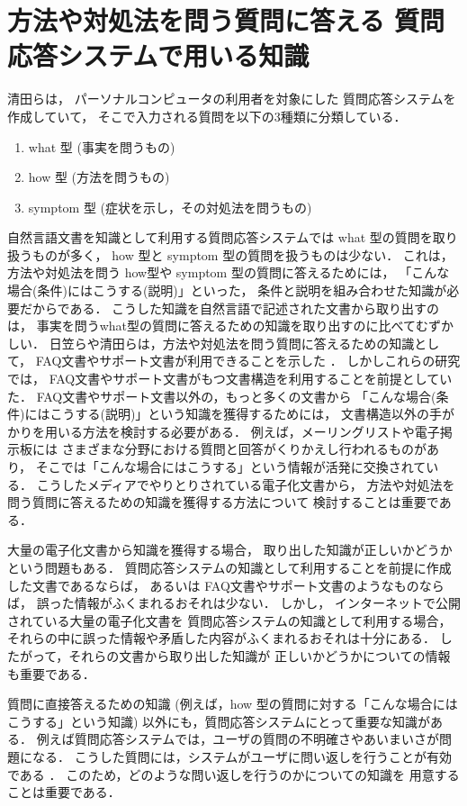  \section{方法や対処法を問う質問に答える
 質問応答システムで用いる知識}

 清田らは，
 パーソナルコンピュータの利用者を対象にした
 質問応答システムを作成していて，
 そこで入力される質問を以下の3種類に分類している\cite{proc:kiyota02}．
 \begin{enumerate}
  \item what 型 (事実を問うもの)
  \item how 型 (方法を問うもの)
  \item symptom 型 (症状を示し，その対処法を問うもの)
 \end{enumerate}
 自然言語文書を知識として利用する質問応答システムでは
 what 型の質問を取り扱うものが多く，
 how 型と symptom 型の質問を扱うものは少ない．
 これは，方法や対処法を問う how型や symptom 型の質問に答えるためには，
 「こんな場合(条件)にはこうする(説明)」といった，
 条件と説明を組み合わせた知識が必要だからである．
 こうした知識を自然言語で記述された文書から取り出すのは，
 事実を問うwhat型の質問に答えるための知識を取り出すのに比べてむずかしい．
 日笠らや清田らは，方法や対処法を問う質問に答えるための知識として，
 FAQ文書やサポート文書が利用できることを示した
 \cite{proc:higasa99}\cite{proc:kiyota02}．
 しかしこれらの研究では， 
 FAQ文書やサポート文書がもつ文書構造を利用することを前提としていた．
 FAQ文書やサポート文書以外の，もっと多くの文書から
 「こんな場合(条件)にはこうする(説明)」という知識を獲得するためには，
 文書構造以外の手がかりを用いる方法を検討する必要がある．
 例えば，メーリングリストや電子掲示板には
 さまざまな分野における質問と回答がくりかえし行われるものがあり，
 そこでは「こんな場合にはこうする」という情報が活発に交換されている．
 こうしたメディアでやりとりされている電子化文書から，
 方法や対処法を問う質問に答えるための知識を獲得する方法について
 検討することは重要である．
 

 大量の電子化文書から知識を獲得する場合，
 取り出した知識が正しいかどうかという問題もある．
 質問応答システムの知識として利用することを前提に作成した文書であるならば，
 あるいは FAQ文書やサポート文書のようなものならば，
 誤った情報がふくまれるおそれは少ない．
 しかし， 
 インターネットで公開されている大量の電子化文書を
 質問応答システムの知識として利用する場合，
 それらの中に誤った情報や矛盾した内容がふくまれるおそれは十分にある．
 したがって，それらの文書から取り出した知識が
 正しいかどうかについての情報も重要である．

 質問に直接答えるための知識
 (例えば，how 型の質問に対する「こんな場合にはこうする」という知識)
 以外にも，質問応答システムにとって重要な知識がある．
 例えば質問応答システムでは，ユーザの質問の不明確さやあいまいさが問題になる．
 こうした質問には，システムがユーザに問い返しを行うことが有効である
 \cite{proc:higasa99}\cite{proc:kiyota02}．
 このため，どのような問い返しを行うのかについての知識を
 用意することは重要である．


